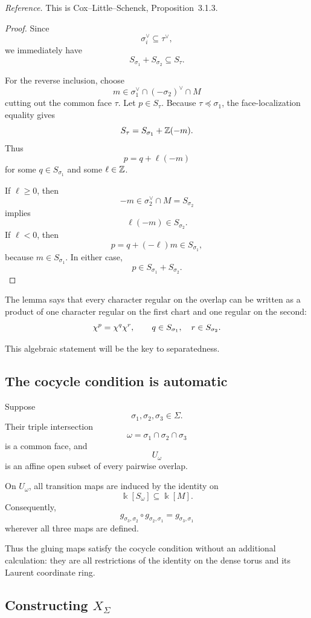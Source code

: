 \noindent
\textit{Reference.}
This is Cox--Little--Schenck, Proposition~3.1.3.

\begin{proof}
Since
\[
\sigma_i^\vee\subseteq\tau^\vee,
\]
we immediately have
\[
S_{\sigma_1}+S_{\sigma_2}
\subseteq
S_\tau.
\]

For the reverse inclusion, choose
\[
m\in
\sigma_1^\vee\cap(-\sigma_2)^\vee\cap M
\]
cutting out the common face \(\tau\). Let \(p\in S_\tau\). Because
\(\tau\preceq\sigma_1\), the face-localization equality gives
\[
S_\tau
=
S_{\sigma_1}+\mathbb{Z}(-m).
\]
Thus
\[
p=q+\ell(-m)
\]
for some \(q\in S_{\sigma_1}\) and some \(\ell\in\mathbb{Z}\).

If \(\ell\geq0\), then
\[
-m\in\sigma_2^\vee\cap M=S_{\sigma_2}
\]
implies
\[
\ell(-m)\in S_{\sigma_2}.
\]
If \(\ell<0\), then
\[
p=q+(-\ell)m\in S_{\sigma_1},
\]
because \(m\in S_{\sigma_1}\). In either case,
\[
p\in S_{\sigma_1}+S_{\sigma_2}.
\]
\end{proof}

The lemma says that every character regular on the overlap can be
written as a product of one character regular on the first chart and
one regular on the second:
\[
\chi^{p}
=
\chi^{q}\chi^{r},
\qquad
q\in S_{\sigma_1},
\quad
r\in S_{\sigma_2}.
\]

This algebraic statement will be the key to separatedness.

\subsection{The cocycle condition is automatic}

Suppose
\[
\sigma_1,\sigma_2,\sigma_3\in\Sigma.
\]
Their triple intersection
\[
\omega
=
\sigma_1\cap\sigma_2\cap\sigma_3
\]
is a common face, and
\[
U_\omega
\]
is an affine open subset of every pairwise overlap.

On \(U_\omega\), all transition maps are induced by the identity on
\[
\Bbbk[S_\omega]\subseteq\Bbbk[M].
\]
Consequently,
\[
g_{\sigma_3,\sigma_2}
\circ
g_{\sigma_2,\sigma_1}
=
g_{\sigma_3,\sigma_1}
\]
wherever all three maps are defined.

Thus the gluing maps satisfy the cocycle condition without an
additional calculation: they are all restrictions of the identity on
the dense torus and its Laurent coordinate ring.

\subsection{Constructing \texorpdfstring{\(X_\Sigma\)}{X Sigma}}

